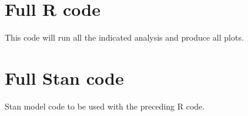 \documentclass[12pt]{article}
\newcommand{\skipline}{\bigskip\bigskip\bigskip}
\begin{document}
    \skipline
    \skipline
    \skipline

    


\newpage
\begin{appendices}

	\section{Full R code}

    This code will run all the indicated analysis and produce all plots.

    

    \section{Full Stan code}

    Stan model code to be used with the preceding R code.

    

\end{appendices}
\end{document}

